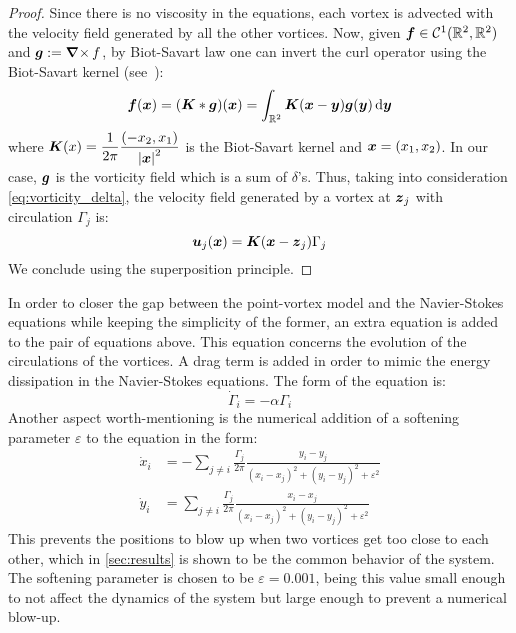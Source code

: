 \documentclass[../main.tex]{subfiles}
\begin{document}
\begin{proof}
	Since there is no viscosity in the equations, each vortex is advected with the velocity field generated by all the other vortices. Now, given $\boldsymbol{f}\in \mathcal{C}^1(\mathbb{R}^2,\mathbb{R}^2)$ and $\boldsymbol{g}:=\operatorname{\boldsymbol{\nabla}\times} f$, by Biot-Savart law one can invert the curl operator using the Biot-Savart kernel (see~\cite{Griffiths}):
	\begin{equation}
		\boldsymbol{f}(\boldsymbol{x}) = (\boldsymbol{K} * \boldsymbol{g})(\boldsymbol{x}) = \int_{\mathbb{R}^2} \boldsymbol{K}(\boldsymbol{x}-\boldsymbol{y}) \boldsymbol{g}(\boldsymbol{y}) \dd{\boldsymbol{y}}
	\end{equation}
	where $\displaystyle\boldsymbol{K}(x) = \frac{1}{2\pi} \frac{(-x_2,x_1)}{{\abs{\boldsymbol{x}}^2}}$ is the Biot-Savart kernel and $\boldsymbol{x}=(x_1,x_2)$. In our case, $\boldsymbol{g}$ is the vorticity field which is a sum of $\delta$'s. Thus, taking into consideration \cref{eq:vorticity_delta}, the velocity field generated by a vortex at $\boldsymbol{z}_j$ with circulation $\Gamma_j$ is:
	\begin{equation}
		\boldsymbol{u}_j(\boldsymbol{x}) = \boldsymbol{K}(\boldsymbol{x}-\boldsymbol{z}_j) \Gamma_j
	\end{equation}
	We conclude using the superposition principle.
\end{proof}
In order to closer the gap between the point-vortex model and the Navier-Stokes equations while keeping the simplicity of the former, an extra equation is added to the pair of equations above. This equation concerns the evolution of the circulations of the vortices. A drag term is added in order to mimic the energy dissipation in the Navier-Stokes equations. The form of the equation is:
\begin{equation}
	\dot{\Gamma}_i = -\alpha \Gamma_i
\end{equation}
Another aspect worth-mentioning is the numerical addition of a softening parameter $\varepsilon$ to the equation in the form:
\begin{align}
	\dot{x}_i & = -\sum_{j\neq i} \frac{\Gamma_j}{2\pi} \frac{y_i-y_j}{{(x_i-x_j)}^2+{(y_i-y_j)}^2+\varepsilon^2} \\
	\dot{y}_i & = \sum_{j\neq i} \frac{\Gamma_j}{2\pi} \frac{x_i-x_j}{{(x_i-x_j)}^2+{(y_i-y_j)}^2+\varepsilon^2}
\end{align}
This prevents the positions to blow up when two vortices get too close to each other, which in \cref{sec:results} is shown to be the common behavior of the system. The softening parameter is chosen to be $\varepsilon=0.001$, being this value small enough to not affect the dynamics of the system but large enough to prevent a numerical blow-up.
\end{document}
